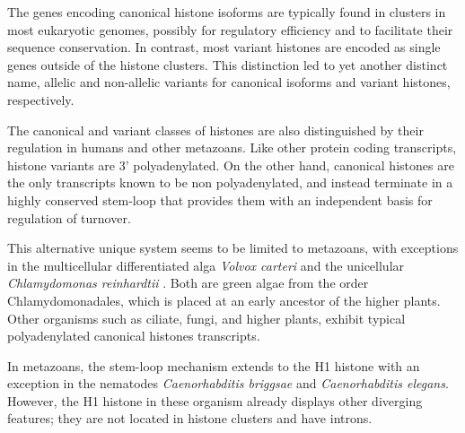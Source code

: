   The genes encoding canonical histone isoforms are typically found in clusters in most eukaryotic
  genomes, possibly for regulatory efficiency and to facilitate their sequence conservation. In
  contrast, most variant histones are encoded as single genes outside of the histone clusters.
  This distinction led to yet another distinct name, allelic and non-allelic variants for
  canonical isoforms and variant histones, respectively.

  The canonical and variant classes of histones are also distinguished by their regulation in humans and other
  metazoans. Like other protein coding transcripts, histone variants
  are 3' polyadenylated. On the other hand, canonical histones are the only transcripts
  known to be non polyadenylated, and instead terminate in a highly conserved stem-loop that
  provides them with an independent basis for regulation of turnover.

  This alternative unique system seems to be limited to metazoans, with exceptions
  in the multicellular differentiated alga \textit{Volvox carteri} \citep{volvox-h2a-h2b-report}
  and the unicellular \textit{Chlamydomonas reinhardtii} \citep{chlamydomonas-histones}.
  Both are green algae from the order Chlamydomonadales, which is placed at an early
  ancestor of the higher plants.
  Other organisms such as ciliate, fungi, and higher plants, exhibit typical
  polyadenylated canonical histones transcripts.


  In metazoans, the stem-loop mechanism extends to the H1 histone with an exception
  in the nematodes \textit{Caenorhabditis briggsae} and \textit{Caenorhabditis elegans}.
  However, the H1 histone in these organism already displays other diverging
  features; they are not located in histone clusters and have introns\citep{caenorhabditis-stem-loop}.

